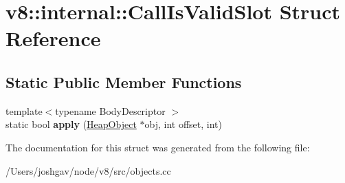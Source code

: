 \hypertarget{structv8_1_1internal_1_1_call_is_valid_slot}{}\section{v8\+:\+:internal\+:\+:Call\+Is\+Valid\+Slot Struct Reference}
\label{structv8_1_1internal_1_1_call_is_valid_slot}
\subsection*{Static Public Member Functions}
\begin{DoxyCompactItemize}
\item 
{\footnotesize template$<$typename Body\+Descriptor $>$ }\\static bool {\bfseries apply} (\hyperlink{classv8_1_1internal_1_1_heap_object}{Heap\+Object} $\ast$obj, int offset, int)\hypertarget{structv8_1_1internal_1_1_call_is_valid_slot_af1bf33d8bee8dae2f135f00a4b7be38b}{}\label{structv8_1_1internal_1_1_call_is_valid_slot_af1bf33d8bee8dae2f135f00a4b7be38b}

\end{DoxyCompactItemize}


The documentation for this struct was generated from the following file\+:\begin{DoxyCompactItemize}
\item 
/\+Users/joshgav/node/v8/src/objects.\+cc\end{DoxyCompactItemize}
